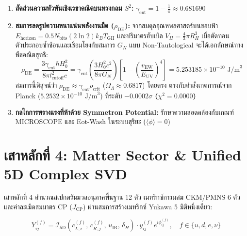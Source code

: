 \documentclass[11pt, a4paper]{article}
\begin{document}
\begin{enumerate}
    \item \textbf{สัดส่วนความพัวพันเชิงเรขาคณิตบนทรงกลม $S^2$:} $\gamma_{\text{ent}} = 1 - \frac{1}{\pi} \approx 0.681690$
    \item \textbf{สมการลดรูปความหนาแน่นพลังงานมืด ($\rho_{\text{DE}}$):} จากสมดุลอุณหพลศาสตร์บนขอบฟ้า $E_{\text{horizon}} = 0.5 N_{\text{bits}} (2 \ln 2) k_B T_{\text{GH}}$ และปริมาตรฮับเบิล $V_H = \frac{4}{3}\pi R_H^3$ เมื่อตัดทอนตัวประกอบซ้ำซ้อนและเชื่อมโยงกับสมการ $G_N$ แบบ Non-Tautological จะได้เอกลักษณ์ทางพีชคณิตสุทธิ:
    \begin{equation}
    \rho_{\text{DE}} = \frac{3\gamma_{\text{ent}} \hbar H_0^2}{8\pi l_{\text{cutoff}}^2 c} = \gamma_{\text{ent}} \left(\frac{3 H_0^2 c^2}{8\pi G_N}\right) \left[ 1 - \left(\frac{v_{\text{EW}}}{E_{\text{UV}}}\right)^4 \right] = 5.253185 \times 10^{-10}\text{ J/m}^3
    \end{equation}
    สมการนี้พิสูจน์ว่า $\rho_{\text{DE}} \approx \gamma_{\text{ent}} \rho_{\text{crit}}$ ($\Omega_\Lambda \approx 0.6817$) โดยตรง ตรงกับค่าสังเกตการณ์จาก Planck ($5.2532 \times 10^{-10}\text{ J/m}^3$) ที่ระดับ \textbf{$-0.0002\sigma$ ($\chi^2 = 0.0000$)}
    \item \textbf{กลไกการพรางแรงที่ห้าด้วย Symmetron Potential:} รักษาความสอดคล้องกับเกณฑ์ MICROSCOPE และ Eot-Wash ในระบบสุริยะ ($\langle\phi\rangle = 0$)
\end{enumerate}

\section{เสาหลักที่ 4: Matter Sector \& Unified 5D Complex SVD}

เสาหลักที่ 4 คำนวณสเปกตรัมมวลอนุภาคพื้นฐาน 12 ตัว เมทริกซ์การผสม CKM/PMNS 6 ตัว และค่าละเมิดสมมาตร CP ($J_{\text{CP}}$) ผ่านสมการสร้างเมทริกซ์ Yukawa 5 มิติหนึ่งเดียว:

\begin{equation}
Y_{ij}^{(f)} = \mathcal{I}_{5\text{D}}\!\left(c_{L,i}^{(f)},\, c_{R,j}^{(f)},\, u_{\text{IR}},\, \delta_H\right) \cdot y_{ij}^{(f)} e^{i\phi_{ij}^{(f)}}, \quad f \in \{u, d, e, \nu\}
\end{equation}
\end{document}
